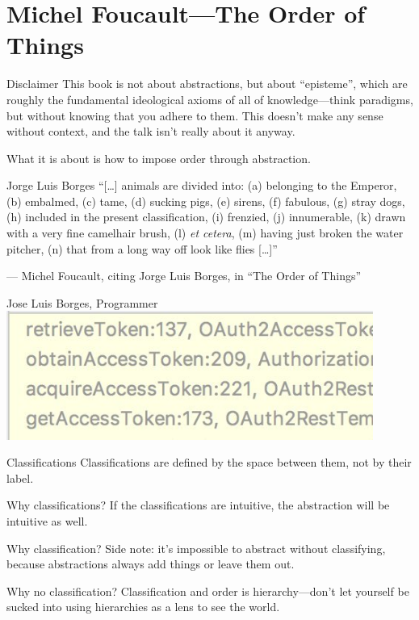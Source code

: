 \documentclass[aspectratio=169]{beamer}
\begin{document}
  \section{Michel Foucault—The Order of Things}
  \begin{frame}{Disclaimer}
    This book is not about abstractions, but about “episteme”, which are roughly
    the fundamental ideological axioms of all of knowledge—think paradigms, but
    without knowing that you adhere to them. This doesn’t make any sense
    without context, and the talk isn’t really about it anyway.

    What it is about is how to impose order through abstraction.
  \end{frame}
  \begin{frame}{Jorge Luis Borges}
    “[\ldots] animals are divided into: (a) belonging to the Emperor, (b)
    embalmed, (c) tame, (d) sucking pigs, (e) sirens, (f) fabulous, (g) stray
    dogs, (h) included in the present classification, (i) frenzied, (j)
    innumerable, (k) drawn with a very fine camelhair brush, (l) \textit{et
    cetera}, (m) having just broken the water pitcher, (n) that from a long
    way off look like flies [\ldots]”

    — Michel Foucault, citing Jorge Luis Borges, in “The Order of Things”
  \end{frame}
  \begin{frame}{Jose Luis Borges, Programmer}
    \includegraphics[width=12cm]{traceback}
  \end{frame}
  \begin{frame}{Classifications}
    Classifications are defined by the space between them, not by their label.
  \end{frame}
  \begin{frame}{Why classifications?}
    If the classifications are intuitive, the abstraction will be intuitive as
    well.
  \end{frame}
  \begin{frame}{Why classification?}
    Side note: it’s impossible to abstract without classifying, because
    abstractions always add things or leave them out.
  \end{frame}
  \begin{frame}{Why no classification?}
    Classification and order is hierarchy—don’t let yourself be sucked into
    using hierarchies as a lens to see the world.
  \end{frame}
\end{document}
